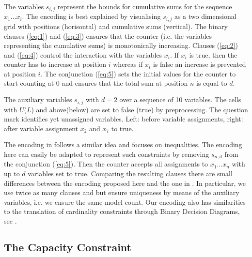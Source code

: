 \documentclass[]{llncs}
\begin{document}
The variables $s_{i,j}$  represent the bounds for cumulative sums for the sequence $x_1 \ldots x_i$. The encoding is
best explained by visualising $s_{i,j}$ as a two dimensional grid with positions (horisontal) and cumulative sums
(vertical). The binary clauses (\ref{eq:1}) and (\ref{eq:3}) ensures that the counter (i.e. the variables representing
the cumulative sums) is monotonically increasing. Clauses (\ref{eq:2}) and (\ref{eq:4}) control the interaction with the
variables $x_i$. If $x_i$ is true, then the counter has to increase at position $i$ whereas if $x_i$ is false an
increase is prevented at position $i$. The conjunction (\ref{eq:5}) sets the initial values for the counter to start
counting at 0 and ensures that the total sum at position $n$ is equal to $d$. 


\begin{example}
The auxiliary variables $s_{i,j}$ with $d=2$ over a sequence of 10 variables. The cells with  $U$($L$) and
above(below) are set to false (true) by preprocessing. The question mark identifies yet unassigned variables. Left:
before variable assignments, right: after variable assignment $x_2$ and $x_7$ to true.
\begin{center}
\begin{minipage}[t]{0.5\textwidth}

\end{minipage}%
\begin{minipage}[t]{0.5\textwidth}

\end{minipage}
\end{center}
\label{ex:1}
\end{example}

The encoding in \cite{Sinz05} follows a similar idea and focuses on inequalities. The encoding here can easily be
adapted to represent such constraints by removing $s_{n,d}$ from the conjunction (\ref{eq:5}). Then the counter accepts
all assignments to $x_1 \ldots x_n$ with up to $d$ variables set to true. Comparing the resulting clauses there are
small differences between the encoding proposed here and the one in \cite{Sinz05}. In particular, we use twice as many
clauses and but ensure uniqueness by means of the auxiliary variables, i.e. we ensure the same model count. Our encoding
also has similarities to the translation of cardinality constraints through Binary Decision Diagrams, see \cite{Een06}.

\subsection{The Capacity Constraint}
\label{sub-capacity}
\end{document}
